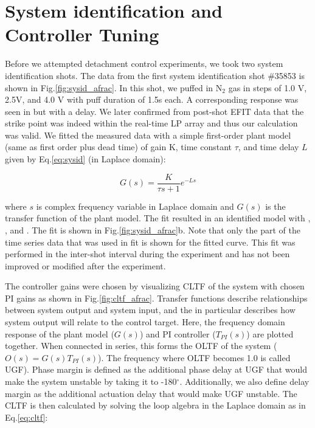 








\section{System identification and Controller Tuning}
\label{sec:sysid}







Before we attempted detachment control experiments, we took two system identification shots.
The data from the first system identification shot \#35853 is shown in Fig.\ref{fig:sysid_afrac}.
In this shot, we puffed in N$_2$ gas in steps of 1.0 V, 2.5V, and 4.0 V with puff duration of 1.5s each.
A corresponding response was seen in \Afrac but with a delay.
We later confirmed from post-shot EFIT data that the strike point was indeed within the real-time \ac{LP} array and thus our \Afrac calculation was valid.
We fitted the measured data with a simple first-order plant model (same as first order plus dead time\cite{Eldon_2022_PPCF}) of gain K, time constant $\tau$, and time delay $L$ given by Eq.\ref{eq:sysid} (in Laplace domain):

\begin{equation}
 G(s) = \frac{K}{\tau s + 1}e^{-L s}
\label{eq:sysid}
\end{equation}

where $s$ is complex frequency variable in Laplace domain and $G(s)$ is the transfer function of the plant model.
The fit resulted in an identified model with \AfracK, \AfracTau, and \AfracL.
The fit is shown in Fig.\ref{fig:sysid_afrac}b.
Note that only the part of the time series data that was used in fit is shown for the fitted curve.
This fit was performed in the inter-shot interval during the experiment and has not been improved or modified after the experiment.

The controller gains were chosen by visualizing \ac{CLTF} of the system with chosen PI gains as shown in Fig.\ref{fig:cltf_afrac}.
Transfer functions describe relationships between system output and system input, and the  in particular describes how system output will relate to the control target. 
Here, the frequency domain response of the plant model ($G(s)$) and PI controller ($T_{PI}(s)$) are plotted together.
When connected in series, this forms the \ac{OLTF} of the system ($O(s) = G(s) T_{PI}(s)$).
The frequency where \ac{OLTF} becomes 1.0 is called \ac{UGF}).
Phase margin is defined as the additional phase delay at \ac{UGF} that would make the system unstable by taking it to -180$^\circ$.
Additionally, we also define delay margin as the additional actuation delay that would make \ac{UGF} unstable.
The \ac{CLTF} is then calculated by solving the loop algebra in the Laplace domain as in Eq.\ref{eq:cltf}:

